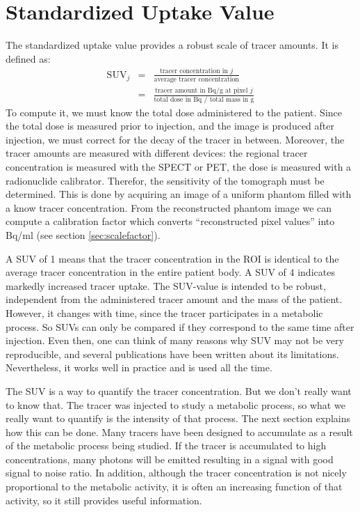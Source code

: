 \section{Standardized Uptake Value}
The standardized uptake value provides a robust scale of tracer amounts. It is
defined as:
\begin{eqnarray}
  \mbox{SUV}_j & = & \frac{\mbox{tracer concentration in $j$}}
                          {\mbox{average tracer concentration}}\\
  & = & \frac{\mbox{tracer amount in Bq/g at pixel $j$}}
                      {\mbox{total dose in Bq / total mass in g}}
\end{eqnarray}
To compute it, we must know the total dose administered to the patient. Since
the total dose is measured prior to injection, and the image is produced after
injection, we must correct for the decay of the tracer in between. Moreover,
the tracer amounts are measured with different devices: the regional tracer
concentration is measured with the SPECT or PET, the dose is measured with a
radionuclide calibrator. Therefor, the sensitivity of the tomograph must be
determined. This is done by acquiring an image of a uniform phantom filled
with a know tracer concentration. From the reconstructed phantom image we can
compute a calibration factor which converts ``reconstructed pixel values''
into Bq/ml (see section \ref{sec:scalefactor}).

A SUV of 1 means that the tracer concentration in the ROI is identical
to the average tracer concentration in the entire patient body. A SUV
of 4 indicates markedly increased tracer uptake. The SUV-value is
intended to be robust, independent from the administered tracer amount
and the mass of the patient. However, it changes with time, since the
tracer participates in a metabolic process. So SUVs can only be
compared if they correspond to the same time after injection. Even
then, one can think of many reasons why SUV may not be very
reproducible, and several publications have been written about its
limitations.  Nevertheless, it works well in practice and is used all
the time.

The SUV is a way to quantify the tracer concentration. But we don't really
want to know that. The tracer was injected to study a metabolic process, so
what we really want to quantify is the intensity of that process. The next
section explains how this can be done. Many tracers have been designed to
accumulate as a result of the metabolic process being studied. If the tracer
is accumulated to high concentrations, many photons will be emitted resulting
in a signal with good signal to noise ratio. In addition, although the tracer
concentration is not nicely proportional to the metabolic activity, it is
often an increasing function of that activity, so it still provides useful
information.

